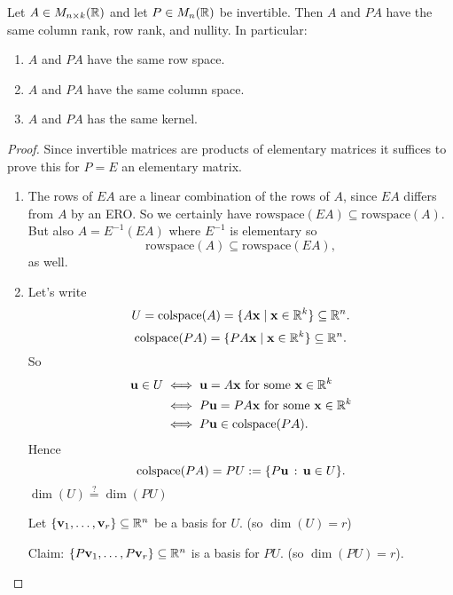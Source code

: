 \documentclass[10pt, a4paper]{article}
\begin{document}
\begin{proposition}
    Let $A \in M_{n \times k}(\mathbb{R})$ and let $P \in M_n(\mathbb{R})$ be invertible.
    Then $A$ and $PA$ have the same column rank,
    row rank,
    and nullity.
    In particular:
    \begin{enumerate}[label = (\roman*)]
        \item $A$ and $PA$ have the same row space.
        \item $A$ and $PA$ have the same column space.
        \item $A$ and $PA$ has the same kernel.
    \end{enumerate}
    \begin{proof}
        Since invertible matrices are products of elementary matrices it suffices to prove this for $P = E$ an elementary matrix.
        \begin{enumerate}[label = (\roman*)]
            \item The rows of $EA$ are a linear combination of the rows of $A$,
            since $EA$ differs from $A$ by an ERO.
            So we certainly have $\mathrm{rowspace}(EA) \subseteq \mathrm{rowspace}(A)$.
            But also $A = E ^ {-1}(EA)$ where $E ^ {-1}$ is elementary so
            \[
            \mathrm{rowspace}(A) \subseteq \mathrm{rowspace}(EA),
            \]
            as well.
            
            \item Let's write
            \[
            U = \mathrm{colspace}(A) = \{A\mathbf{x}\mid \mathbf{x} \in \mathbb{R} ^ k\} \subseteq \mathbb{R} ^ n.
            \]
            \[
            \mathrm{colspace}(PA) = \{PA\mathbf{x} \mid \mathbf{x} \in \mathbb{R} ^ k\} \subseteq \mathbb{R} ^ n.
            \]
            So
            \begin{align*}
                \mathbf{u} \in U &\iff \mathbf{u} = A\mathbf{x}\text{ for some $\mathbf{x} \in \mathbb{R} ^ k$} \\
                &\iff P\mathbf{u} = PA\mathbf{x}\text{ for some $\mathbf{x} \in \mathbb{R} ^ k$} \\
                &\iff P\mathbf{u} \in \mathrm{colspace}(PA).
            \end{align*}
            Hence
            \[
            \mathrm{colspace}(PA) = PU := \{P\mathbf{u}\,:\,\mathbf{u} \in U\}.
            \]
            $\dim{(U)} \overset{?}{=} \dim{(PU)}$

            Let $\{\mathbf{v}_1, \dotsc, \mathbf{v}_r\} \subseteq \mathbb{R} ^ n$ be a basis for $U$.
            (so $\dim(U) = r$)
            
            Claim:
            $\{P\mathbf{v}_1, \dotsc, P\mathbf{v}_r\} \subseteq \mathbb{R} ^ n$ is a basis for $PU$.
            (so $\dim(PU) = r$).
                

\end{enumerate}
\end{proof}
\end{proposition}
\end{document}
